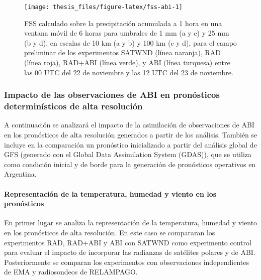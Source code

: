 \documentclass[12pt,oneside,a4paper]{reedthesis}
\begin{document}
\begin{figure}
\texttt{[image: thesis\_files/figure-latex/fss-abi-1]} \caption{FSS calculado sobre la precipitación acumulada a 1 hora en una ventana móvil de 6 horas para umbrales de 1 mm (a y c) y 25 mm (b y d), en escalas de 10 km (a y b) y 100 km (c y d), para el campo preliminar de los experimentos SATWND (línea naranja), RAD (línea roja), RAD+ABI (línea verde), y ABI (línea turquesa) entre las 00 UTC del 22 de noviembre y las 12 UTC del 23 de noviembre.}\label{fig:fss-abi}
\end{figure}
\hypertarget{impacto-de-las-observaciones-de-abi-en-pronuxf3sticos-determinuxedsticos-de-alta-resoluciuxf3n}{%
\subsubsection{Impacto de las observaciones de ABI en pronósticos determinísticos de alta resolución}\label{impacto-de-las-observaciones-de-abi-en-pronuxf3sticos-determinuxedsticos-de-alta-resoluciuxf3n}}

A continuación se analizará el impacto de la asimilación de observaciones de ABI en los pronósticos de alta resolución generados a partir de los análisis. También se incluye en la comparación un pronóstico inicializado a partir del análisis global de GFS (generado con el Global Data Assimilation System (GDAS)), que se utiliza como condición inicial y de borde para la generación de pronósticos operativos en Argentina.

\hypertarget{representaciuxf3n-de-la-temperatura-humedad-y-viento-en-los-pronuxf3sticos}{%
\paragraph{Representación de la temperatura, humedad y viento en los pronósticos}\label{representaciuxf3n-de-la-temperatura-humedad-y-viento-en-los-pronuxf3sticos}}

En primer lugar se analiza la representación de la temperatura, humedad y viento en los pronósticos de alta resolución. En este caso se compararan los experimentos RAD, RAD+ABI y ABI con SATWND como experimento control para evaluar el impacto de incorporar las radianzas de satélites polares y de ABI. Posteriormente se comparan los experimentos con observaciones independientes de EMA y radiosondeos de RELAMPAGO.
\end{document}
